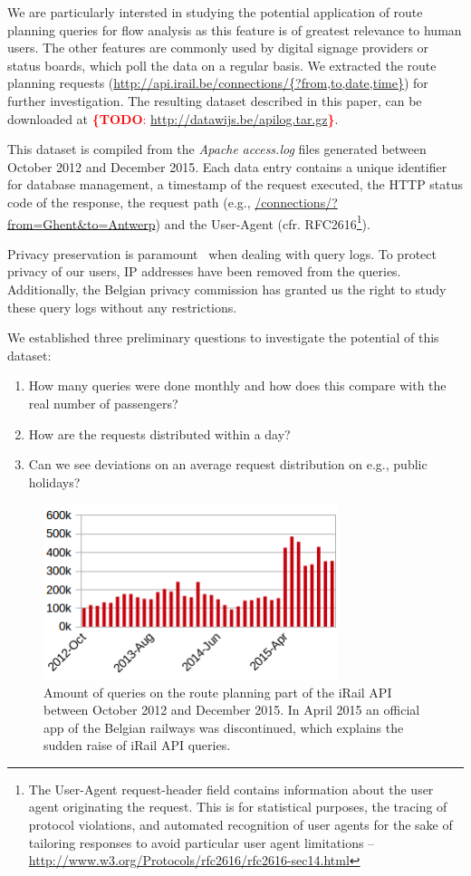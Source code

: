 \documentclass{sig-alternate}
\newcommand{\todo}[1]{\noindent\textcolor{red}{{\bf \{TODO}: #1{\bf \}}}}
\begin{document}
We are particularly intersted in studying the potential application of route planning queries for flow analysis as this feature is of greatest relevance to human users.
The other features are commonly used by digital signage providers or status boards, which poll the data on a regular basis.
We extracted the route planning requests (\url{http://api.irail.be/connections/{?from,to,date,time}}) for further investigation.
The resulting dataset described in this paper, can be downloaded at \todo{\url{http://datawijs.be/apilog.tar.gz}}.

This dataset is compiled from the \emph{Apache} \emph{access.log} files generated between October 2012 and December 2015. 
Each data entry contains a unique identifier for database management, a timestamp of the request  executed, the HTTP status code of the response, the request path (e.g., \url{/connections/?from=Ghent\&to=Antwerp}) and the User-Agent (cfr. RFC2616\footnote{The User-Agent request-header field contains information about the user agent originating the request. 
This is for statistical purposes, the tracing of protocol violations, and automated recognition of user agents for the sake of tailoring responses to avoid particular user agent limitations -- \url{http://www.w3.org/Protocols/rfc2616/rfc2616-sec14.html}}).

Privacy preservation is paramount~\cite{silvestri} when dealing with query logs. To protect privacy of our users, IP addresses have been removed from the queries. Additionally, the Belgian privacy commission has granted us the right to study these query logs without any restrictions.

We established three preliminary questions to  investigate the potential of this dataset:
\begin{enumerate}
  \item How many queries were done monthly and how does this compare with the real number of passengers?
  \item How are the requests distributed within a day?
  \item Can we see deviations on an average request distribution on e.g., public holidays?
\end{enumerate}

\begin{figure}
\centering
\includegraphics[width=8.6cm]{querylogs}
\caption{Amount of queries on the route planning part of the iRail API between October 2012 and December 2015. In April 2015 an official app of the Belgian railways was discontinued, which explains the sudden raise of iRail API queries.}
\label{fig:querylogs}
\end{figure}
\end{document}
